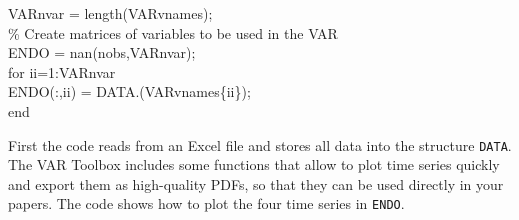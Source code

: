 \documentclass[10pt]{article}
\begin{document}
{\hspace{1mm}VARnvar        = length(VARvnames); \\ 
\hspace{1mm}\textcolor{matlabgreen}{\% Create matrices of variables to be used in the VAR }\\ 
\hspace{1mm}ENDO = nan(nobs,VARnvar); \\ 
\hspace{1mm}\textcolor{matlabblue}{for} ii=1:VARnvar \\ 
\hspace{1mm}\hspace{5mm} ENDO(:,ii) = DATA.(VARvnames\{ii\}); \\ 
\hspace{1mm}\textcolor{matlabblue}{end} \\ 
}

First the code reads from an Excel file and stores all data into the
structure \texttt{DATA}. The VAR Toolbox includes some functions that allow
to plot time series quickly and export them as high-quality PDFs, so that
they can be used directly in your papers. The code shows how to plot the
four time series in \texttt{ENDO}.
\end{document}
